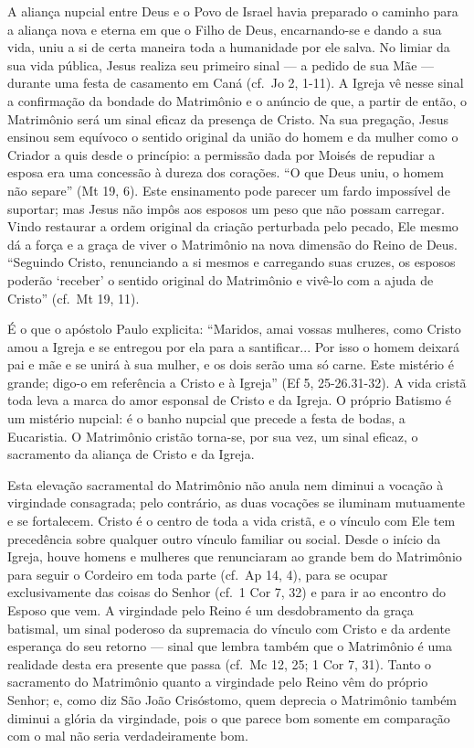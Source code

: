 A aliança nupcial entre Deus e o Povo de Israel havia preparado o caminho para a aliança nova e eterna em que o Filho de Deus, encarnando-se e dando a sua vida, uniu a si de certa maneira toda a humanidade por ele salva. No limiar da sua vida pública, Jesus realiza seu primeiro sinal --- a pedido de sua Mãe --- durante uma festa de casamento em Caná (cf.~Jo 2, 1-11). A Igreja vê nesse sinal a confirmação da bondade do Matrimônio e o anúncio de que, a partir de então, o Matrimônio será um sinal eficaz da presença de Cristo. Na sua pregação, Jesus ensinou sem equívoco o sentido original da união do homem e da mulher como o Criador a quis desde o princípio: a permissão dada por Moisés de repudiar a esposa era uma concessão à dureza dos corações. ``O que Deus uniu, o homem não separe'' (Mt 19, 6). Este ensinamento pode parecer um fardo impossível de suportar; mas Jesus não impôs aos esposos um peso que não possam carregar. Vindo restaurar a ordem original da criação perturbada pelo pecado, Ele mesmo dá a força e a graça de viver o Matrimônio na nova dimensão do Reino de Deus. ``Seguindo Cristo, renunciando a si mesmos e carregando suas cruzes, os esposos poderão `receber' o sentido original do Matrimônio e vivê-lo com a ajuda de Cristo'' (cf.~Mt 19, 11).

É o que o apóstolo Paulo explicita: ``Maridos, amai vossas mulheres, como Cristo amou a Igreja e se entregou por ela para a santificar... Por isso o homem deixará pai e mãe e se unirá à sua mulher, e os dois serão uma só carne. Este mistério é grande; digo-o em referência a Cristo e à Igreja'' (Ef 5, 25-26.31-32). A vida cristã toda leva a marca do amor esponsal de Cristo e da Igreja. O próprio Batismo é um mistério nupcial: é o banho nupcial que precede a festa de bodas, a Eucaristia. O Matrimônio cristão torna-se, por sua vez, um sinal eficaz, o sacramento da aliança de Cristo e da Igreja.

Esta elevação sacramental do Matrimônio não anula nem diminui a vocação à virgindade consagrada; pelo contrário, as duas vocações se iluminam mutuamente e se fortalecem. Cristo é o centro de toda a vida cristã, e o vínculo com Ele tem precedência sobre qualquer outro vínculo familiar ou social. Desde o início da Igreja, houve homens e mulheres que renunciaram ao grande bem do Matrimônio para seguir o Cordeiro em toda parte (cf.~Ap 14, 4), para se ocupar exclusivamente das coisas do Senhor (cf.~1 Cor 7, 32) e para ir ao encontro do Esposo que vem. A virgindade pelo Reino é um desdobramento da graça batismal, um sinal poderoso da supremacia do vínculo com Cristo e da ardente esperança do seu retorno --- sinal que lembra também que o Matrimônio é uma realidade desta era presente que passa (cf.~Mc 12, 25; 1 Cor 7, 31). Tanto o sacramento do Matrimônio quanto a virgindade pelo Reino vêm do próprio Senhor; e, como diz São João Crisóstomo, quem deprecia o Matrimônio também diminui a glória da virgindade, pois o que parece bom somente em comparação com o mal não seria verdadeiramente bom.

